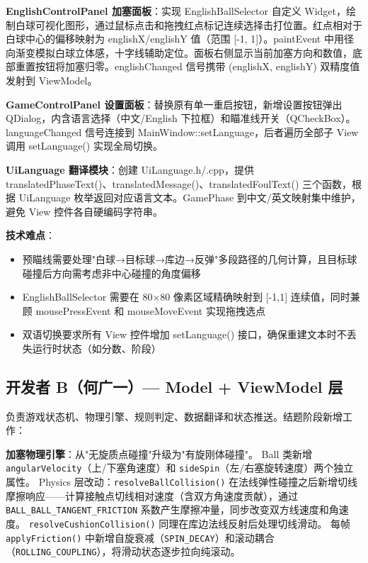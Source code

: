 \documentclass[11pt]{ctexart}
\begin{document}
\textbf{EnglishControlPanel 加塞面板}：实现 EnglishBallSelector 自定义 Widget，绘制白球可视化图形，通过鼠标点击和拖拽红点标记连续选择击打位置。红点相对于白球中心的偏移映射为 englishX/englishY 值（范围 [-1, 1]）。paintEvent 中用径向渐变模拟白球立体感，十字线辅助定位。面板右侧显示当前加塞方向和数值，底部重置按钮将加塞归零。englishChanged 信号携带 (englishX, englishY) 双精度值发射到 ViewModel。

\textbf{GameControlPanel 设置面板}：替换原有单一重启按钮，新增设置按钮弹出 QDialog，内含语言选择（中文/English 下拉框）和瞄准线开关（QCheckBox）。languageChanged 信号连接到 MainWindow::setLanguage，后者遍历全部子 View 调用 setLanguage() 实现全局切换。

\textbf{UiLanguage 翻译模块}：创建 UiLanguage.h/.cpp，提供 translatedPhaseText()、translatedMessage()、translatedFoulText() 三个函数，根据 UiLanguage 枚举返回对应语言文本。GamePhase 到中文/英文映射集中维护，避免 View 控件各自硬编码字符串。

\textbf{技术难点}：
\begin{itemize}
\item 预瞄线需要处理"白球→目标球→库边→反弹"多段路径的几何计算，且目标球碰撞后方向需考虑非中心碰撞的角度偏移
\item EnglishBallSelector 需要在 80×80 像素区域精确映射到 [-1,1] 连续值，同时兼顾 mousePressEvent 和 mouseMoveEvent 实现拖拽选点
\item 双语切换要求所有 View 控件增加 setLanguage() 接口，确保重建文本时不丢失运行时状态（如分数、阶段）
\end{itemize}

\subsection{开发者 B（何广一）— Model + ViewModel 层}

负责游戏状态机、物理引擎、规则判定、数据翻译和状态推送。结题阶段新增工作：

\textbf{加塞物理引擎}：从"无旋质点碰撞"升级为"有旋刚体碰撞"。
Ball 类新增 \texttt{angularVelocity}（上/下塞角速度）和 \texttt{sideSpin}（左/右塞旋转速度）两个独立属性。
Physics 层改动：\texttt{resolveBallCollision()} 在法线弹性碰撞之后新增切线摩擦响应——计算接触点切线相对速度（含双方角速度贡献），通过 \texttt{BALL\_BALL\_TANGENT\_FRICTION} 系数产生摩擦冲量，同步改变双方线速度和角速度。
\texttt{resolveCushionCollision()} 同理在库边法线反射后处理切线滑动。
每帧 \texttt{applyFriction()} 中新增自旋衰减（\texttt{SPIN\_DECAY}）和滚动耦合（\texttt{ROLLING\_COUPLING}），将滑动状态逐步拉向纯滚动。
\end{document}
